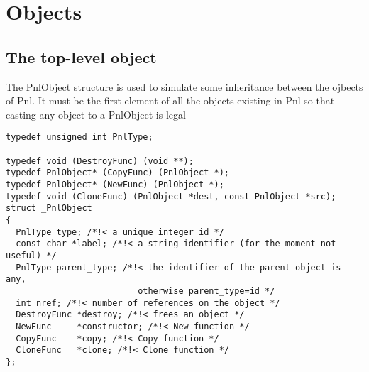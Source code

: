 \section{Objects}

\subsection{The top-level object}

The PnlObject structure is used to simulate some inheritance between the
ojbects of Pnl.  It must be the first element of all the objects existing in
Pnl so that casting any object to a PnlObject is legal

\begin{lstlisting}
typedef unsigned int PnlType; 

typedef void (DestroyFunc) (void **);
typedef PnlObject* (CopyFunc) (PnlObject *);
typedef PnlObject* (NewFunc) (PnlObject *);
typedef void (CloneFunc) (PnlObject *dest, const PnlObject *src);
struct _PnlObject
{
  PnlType type; /*!< a unique integer id */
  const char *label; /*!< a string identifier (for the moment not useful) */
  PnlType parent_type; /*!< the identifier of the parent object is any,
                          otherwise parent_type=id */
  int nref; /*!< number of references on the object */ 
  DestroyFunc *destroy; /*!< frees an object */
  NewFunc     *constructor; /*!< New function */
  CopyFunc    *copy; /*!< Copy function */
  CloneFunc   *clone; /*!< Clone function */
};
\end{lstlisting}


